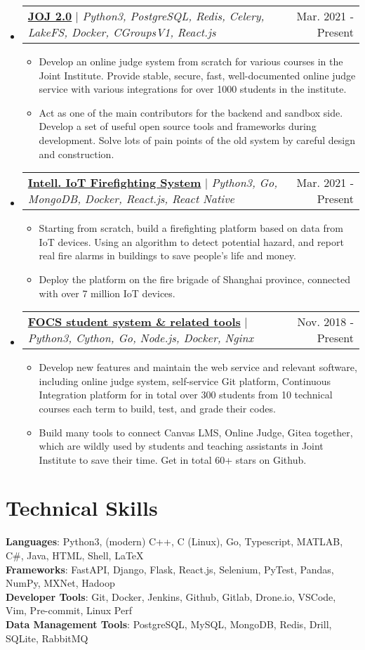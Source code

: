 \documentclass[letterpaper,11pt]{article}
\makeatletter
\newcommand{\resumeItem}[1]{
  \item\small{
    {#1 \vspace{-2pt}}
  }
}
\newcommand{\resumeProjectHeading}[2]{
    \item
    \begin{tabular*}{0.97\textwidth}{l@{\extracolsep{\fill}}r}
      \small#1 & #2 \\
    \end{tabular*}\vspace{-7pt}
}
\newcommand{\resumeSubHeadingListStart}{\begin{itemize}[leftmargin=0.15in, label={}]}
\newcommand{\resumeSubHeadingListEnd}{\end{itemize}}
\newcommand{\resumeItemListStart}{\begin{itemize}}
\newcommand{\resumeItemListEnd}{\end{itemize}\vspace{-5pt}}
\makeatother
\begin{document}
    \resumeSubHeadingListStart
      \resumeProjectHeading
        {\href{https://github.com/joint-online-judge}{\textbf{JOJ 2.0}} $|$ \emph{Python3, PostgreSQL, Redis, Celery, LakeFS, Docker, CGroupsV1, React.js}}{Mar. 2021 - Present}
        \resumeItemListStart
          \resumeItem{Develop an online judge system from scratch for various courses
          in the Joint Institute. Provide stable, secure, fast, well-documented online judge service with various integrations for over 1000 students in the institute.}
          \resumeItem{Act as one of the main contributors for the backend and sandbox side. Develop a set of useful open source tools and frameworks during development. Solve lots of pain points of the old system by careful design and construction.}
        \resumeItemListEnd
      \resumeProjectHeading
        {\href{https://github.com/SJTU-IPP-Firefighting}{\textbf{Intell. IoT Firefighting System}} $|$ \emph{Python3, Go, MongoDB, Docker, React.js, React Native}}{Mar. 2021 - Present}
        \resumeItemListStart
          \resumeItem{Starting from scratch, build a firefighting platform based on data from IoT devices. Using an algorithm to detect potential hazard, and report real fire alarms in buildings to save people's life and money.}
          \resumeItem{Deploy the platform on the fire brigade of Shanghai province, connected with over 7 million IoT devices.}
        \resumeItemListEnd
      \resumeProjectHeading
        {\href{https://gist.github.com/BoYanZh/fc4469c20fd6adf42c212114532aaac0}{\textbf{FOCS student system \& related tools}} $|$ \emph{Python3, Cython, Go, Node.js, Docker, Nginx}}{Nov. 2018 - Present}
        \resumeItemListStart
          \resumeItem{Develop new features and maintain the web service and relevant software, including online judge system, self-service Git platform, Continuous Integration platform for in total over 300 students from 10 technical courses each term to build, test, and grade their codes.}
          \resumeItem{Build many tools to connect Canvas LMS, Online Judge, Gitea together, which are wildly used by students and teaching assistants in Joint Institute to save their time. Get in total 60+ stars on Github.}
        \resumeItemListEnd
    \resumeSubHeadingListEnd


%
\section{Technical Skills}
 \begin{itemize}[leftmargin=0.15in, label={}]
    \small{\item{
     \textbf{Languages}{: Python3, (modern) C++, C (Linux), Go, Typescript, MATLAB, C\#, Java, HTML, Shell, \LaTeX} \\
     \textbf{Frameworks}{: FastAPI, Django, Flask, React.js, Selenium, PyTest, Pandas, NumPy, MXNet, Hadoop} \\
     \textbf{Developer Tools}{: Git, Docker, Jenkins, Github, Gitlab, Drone.io, VSCode, Vim, Pre-commit, Linux Perf} \\
     \textbf{Data Management Tools}{: PostgreSQL, MySQL, MongoDB, Redis, Drill, SQLite, RabbitMQ} \\
    }}
 \end{itemize}


\end{document}
